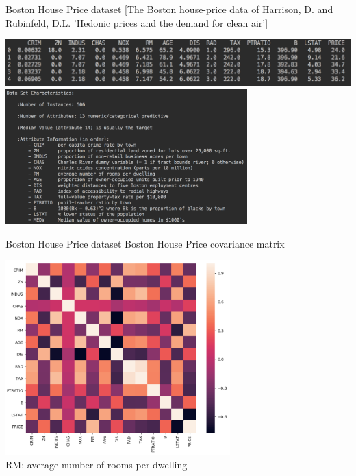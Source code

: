 \documentclass{beamer}
\begin{document}
\begin{frame}{Boston House Price dataset}
[The Boston house-price data of Harrison, D. and Rubinfeld, D.L. 'Hedonic
prices and the demand for clean air']
\begin{center}
\includegraphics[width=1\textwidth]{boston}\\
\includegraphics[width=0.7\textwidth, trim=0 9cm 0 0cm]{boston_descr}
\end{center}
\end{frame}

\begin{frame}{Boston House Price dataset}
Boston House Price covariance matrix\\
\begin{center}
\includegraphics[width=0.65\textwidth]{boston_house_price_correlation}\\
RM: average number of rooms per dwelling
\end{center}
\end{frame}
\end{document}
